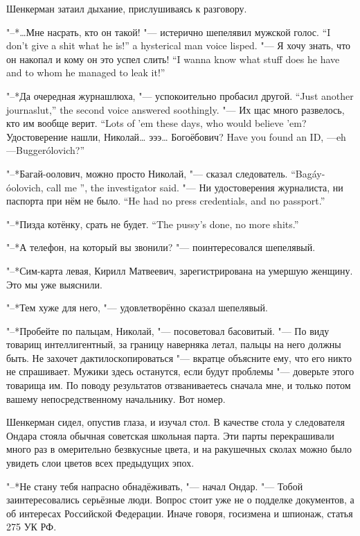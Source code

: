 \asterism

Шенкерман затаил дыхание, прислушиваясь к разговору.

{"--*\ldots{}Мне насрать, кто он такой! "--- истерично шепелявил мужской голос.}
{``I don't give a shit what he is!'' a hysterical man voice lisped.}
{"--- Я хочу знать, что он накопал и кому он это успел слить!}
{``I wanna know what stuff does he have and to whom he managed to leak it!''}

{"--*Да очередная журнашлюха, "--- успокоительно пробасил другой.}
{``Just another journaslut,'' the second voice answered soothingly.}
{"--- Их щас много развелось, кто им вообще верит.}
{``Lots of 'em these days, who would believe 'em?}
{Удостоверение нашли, Николай\ldots{} эээ\ldots{} Богоёбович?}
{Have you found an ID, \Nikolay---eh---Bugger\'olovich?''}

{"--*Багай-оолович, можно просто Николай, "--- сказал следователь.}
{``Bag\'ay-\'oolovich, call me \Nikolay'', the investigator said.}
{"--- Ни удостоверения журналиста, ни паспорта при нём не было.}
{``He had no press credentials, and no passport.''}

{"--*Пизда котёнку, срать не будет.}
{``The pussy's done, no more shits.''}

"--*А телефон, на который вы звонили? "--- поинтересовался шепелявый.

"--*Сим-карта левая, Кирилл Матвеевич, зарегистрирована на умершую женщину.
Это мы уже выяснили.

"--*Тем хуже для него, "--- удовлетворённо сказал шепелявый.

"--*Пробейте по пальцам, Николай, "--- посоветовал басовитый.
"--- По виду товарищ интеллигентный, за границу наверняка летал, пальцы на него должны быть.
Не захочет дактилоскопироваться "--- вкратце объясните ему, что его никто не спрашивает.
Мужики здесь останутся, если будут проблемы "--- доверьте этого товарища им.
По поводу результатов отзваниваетесь сначала мне, и только потом вашему непосредственному начальнику.
Вот номер.

\asterism

Шенкерман сидел, опустив глаза, и изучал стол.
В качестве стола у следователя Ондара стояла обычная советская школьная парта.
Эти парты перекрашивали много раз в омерительно безвкусные цвета, и на ракушечных сколах можно было увидеть слои цветов всех предыдущих эпох.

"--*Не стану тебя напрасно обнадёживать, "--- начал Ондар.
"--- Тобой заинтересовались серьёзные люди.
Вопрос стоит уже не о подделке документов, а об интересах Российской Федерации.
Иначе говоря, госизмена и шпионаж, статья 275 УК РФ.

